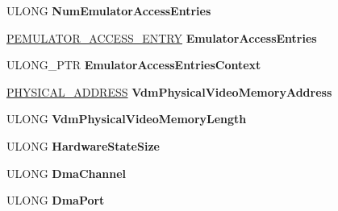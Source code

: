 \begin{DoxyCompactItemize}
\item 
\mbox{\label{struct___v_i_d_e_o___p_o_r_t___c_o_n_f_i_g___i_n_f_o_a5acb07a7429f2813651f43bcb3bfaf8a}} 
U\+L\+O\+NG {\bfseries Num\+Emulator\+Access\+Entries}
\item 
\mbox{\label{struct___v_i_d_e_o___p_o_r_t___c_o_n_f_i_g___i_n_f_o_a8d03174656a7e6a883b4a149b055fc92}} 
\hyperlink{struct___e_m_u_l_a_t_o_r___a_c_c_e_s_s___e_n_t_r_y}{P\+E\+M\+U\+L\+A\+T\+O\+R\+\_\+\+A\+C\+C\+E\+S\+S\+\_\+\+E\+N\+T\+RY} {\bfseries Emulator\+Access\+Entries}
\item 
\mbox{\label{struct___v_i_d_e_o___p_o_r_t___c_o_n_f_i_g___i_n_f_o_ab22509a6f952870b200b56d8e6249b5c}} 
U\+L\+O\+N\+G\+\_\+\+P\+TR {\bfseries Emulator\+Access\+Entries\+Context}
\item 
\mbox{\label{struct___v_i_d_e_o___p_o_r_t___c_o_n_f_i_g___i_n_f_o_a17cbdb4f9d3ad25bd4ee58592de073d7}} 
\hyperlink{union___l_a_r_g_e___i_n_t_e_g_e_r}{P\+H\+Y\+S\+I\+C\+A\+L\+\_\+\+A\+D\+D\+R\+E\+SS} {\bfseries Vdm\+Physical\+Video\+Memory\+Address}
\item 
\mbox{\label{struct___v_i_d_e_o___p_o_r_t___c_o_n_f_i_g___i_n_f_o_ab83e2a40659463d3e03c768d29904e80}} 
U\+L\+O\+NG {\bfseries Vdm\+Physical\+Video\+Memory\+Length}
\item 
\mbox{\label{struct___v_i_d_e_o___p_o_r_t___c_o_n_f_i_g___i_n_f_o_a375795b4edc99fa4b25264e10dd7084f}} 
U\+L\+O\+NG {\bfseries Hardware\+State\+Size}
\item 
\mbox{\label{struct___v_i_d_e_o___p_o_r_t___c_o_n_f_i_g___i_n_f_o_a225b780169214dfa419286c4db93960f}} 
U\+L\+O\+NG {\bfseries Dma\+Channel}
\item 
\mbox{\label{struct___v_i_d_e_o___p_o_r_t___c_o_n_f_i_g___i_n_f_o_ad4c0fda1b317b3a3bf7c2172be0a078f}} 
U\+L\+O\+NG {\bfseries Dma\+Port}

\end{DoxyCompactItemize}

